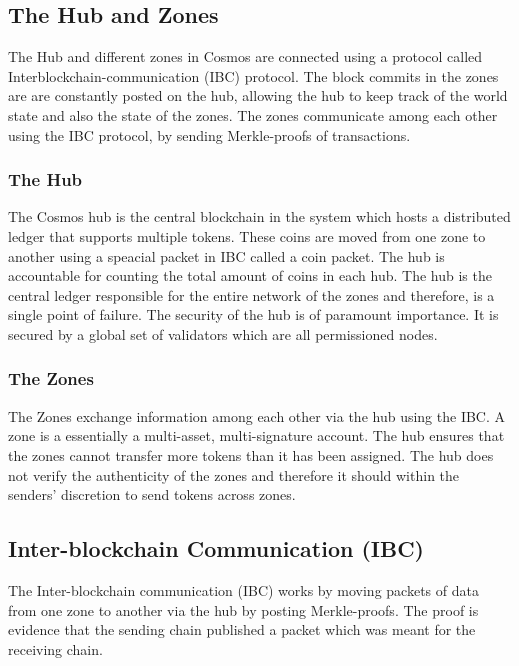 \documentclass[a4paper,twoside,phd]{BYUPhys}
\begin{document}
\subsection{The Hub and Zones}
The Hub and different zones in Cosmos are connected using a protocol called Interblockchain-communication (IBC) protocol. The block commits in the zones are are constantly posted on the hub, allowing the hub to keep track of the world state and also the state of the zones. The zones communicate among each other using the IBC protocol, by sending Merkle-proofs of transactions. 
\subsubsection{The Hub}
The Cosmos hub is the central blockchain in the system which hosts a distributed ledger that supports multiple tokens. These coins are moved from one zone to another using a speacial packet in IBC called a coin packet. The hub is accountable for counting the total amount of coins in each hub. The hub is the central ledger responsible for the entire network of the zones and therefore, is a single point of failure. The security of the hub is of paramount importance. It is secured by a global set of validators which are all permissioned nodes.
\subsubsection{The Zones}
The Zones exchange information among each other via the hub using the IBC. A zone is a essentially a multi-asset, multi-signature account. The hub ensures that the zones cannot transfer more tokens than it has been assigned. The hub does not verify the authenticity of the zones and therefore it should within the senders' discretion to send tokens across zones. 
\subsection{Inter-blockchain Communication (IBC)}
The Inter-blockchain communication (IBC) works by moving packets of data from one zone to another via the hub by posting Merkle-proofs. The proof is evidence that the sending chain published a packet which was meant for the receiving chain. 
\end{document}
